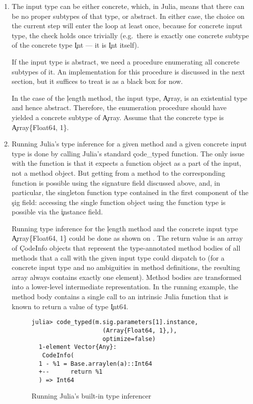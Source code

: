 \documentclass[sigplan,screen]{acmart}
\begin{document}
\begin{enumerate}
  \item The input type can be either concrete, which, in Julia, means that there can
  be no proper subtypes of that type, or abstract. In either case, the choice on the
  current step will enter the loop at least once, because for concrete input type,
  the check holds once trivially (e.g.\ there is exactly one concrete
  subtype of the concrete type \c{Int} --- it is \c{Int} itself).

  If the input type is abstract, we need a procedure enumerating all concrete
  subtypes of it. An implementation for this procedure is discussed in the next
  section, but it suffices to treat is as a black box for now.

  In the case of the \c{length} method, the input type, \c{Array}, is
  an existential type and hence abstract. Therefore, the enumeration procedure
  should have yielded a concrete subtype of \c{Array}. Assume that
  the concrete type is \c{Array\{Float64, 1\}}.

  \item Running Julia's type inference for a given method and a given concrete input
  type is done by calling Julia's standard \c{code\_typed} function.
  The only issue with the function is that it expects a function object as a
  part of the input, not a method object. But getting from a method to the
  corresponding function is possible using the signature field discussed above,
  and, in particular, the singleton function type contained in the first component
  of the \c{sig} field: accessing the single function object using the function
  type is possible via the \c{instance} field.

  Running type inference for the \c{length} method and the concrete input type
  \c{Array\{Float64, 1\}} could be done as shown on .
  The return value is an array of \c{CodeInfo} objects that represent
  the type-annotated method bodies of all methods that a call with the given input type
  could dispatch to (for a concrete input type and no ambiguities in method
  definitions, the resulting array always contains exactly one element).
  Method bodies are transformed into
  a lower-level intermediate representation.
  In the running example, the
  method body contains a single call to an intrinsic Julia function that is
  known to return a value of type \c{Int64}.

  \begin{figure}%
\begin{lstlisting}[style=jterm]
  julia> code_typed(m.sig.parameters[1].instance,
                    (Array{Float64, 1},),
                    optimize=false)
  1-element Vector{Any}:
   CodeInfo(
  1 - %1 = Base.arraylen(a)::Int64
  +--      return %1
  ) => Int64
\end{lstlisting}
    \caption{Running Julia's built-in type inferencer}%
    \label{fig:julia-type-infer}
  \end{figure}


\end{enumerate}
\end{document}
